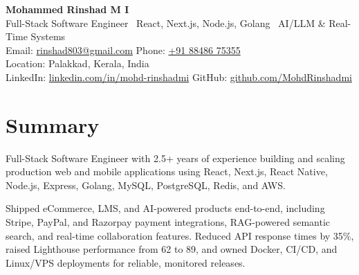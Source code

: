 \documentclass[a4paper,10pt]{article}
\begin{document}
\begin{center}
  {\LARGE\bfseries Mohammed Rinshad M I}\\[3pt]
  {\footnotesize Full-Stack Software Engineer \textbar\ React, Next.js, Node.js, Golang \textbar\ AI/LLM \& Real-Time Systems}\\[4pt]
  {\footnotesize
    Email: \href{mailto:rinshad803@gmail.com}{rinshad803@gmail.com} \quad\textbar\quad
    Phone: \href{tel:+918848675355}{+91 88486 75355} \\[2pt]
    Location: Palakkad, Kerala, India \\[2pt]
    LinkedIn: \href{https://linkedin.com/in/mohd-rinshadmi}{linkedin.com/in/mohd-rinshadmi} \quad\textbar\quad
    GitHub: \href{https://github.com/MohdRinshadmi}{github.com/MohdRinshadmi}
  }
\end{center}

\section{Summary}
Full-Stack Software Engineer with 2.5+ years of experience building and scaling production web and mobile applications using React, Next.js, React Native, Node.js, Express, Golang, MySQL, PostgreSQL, Redis, and AWS.
\vspace{4pt}

Shipped eCommerce, LMS, and AI-powered products end-to-end, including Stripe, PayPal, and Razorpay payment integrations, RAG-powered semantic search, and real-time collaboration features. Reduced API response times by 35\%, raised Lighthouse performance from 62 to 89, and owned Docker, CI/CD, and Linux/VPS deployments for reliable, monitored releases.

\end{document}
